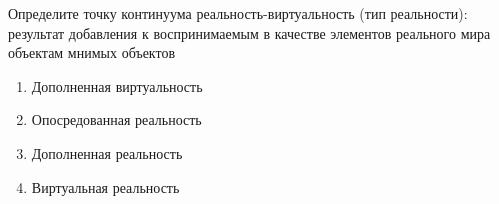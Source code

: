 
Определите точку континуума реальность-виртуальность (тип реальности): результат добавления к воспринимаемым в качестве элементов реального мира объектам мнимых объектов

\begin{enumerate}
    \item Дополненная виртуальность
    \item Опосредованная реальность
    \item Дополненная реальность
    \item Виртуальная реальность
\end{enumerate}